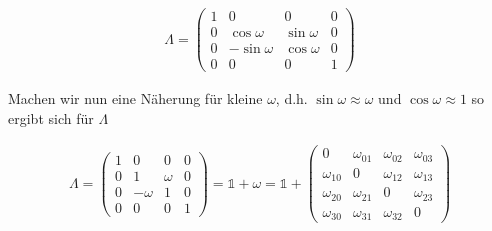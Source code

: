 \begin{align}
  \label{eq:35}
  \Lambda =  \begin{pmatrix}
1&0&0&0\\
0&\cos\omega&\sin\omega&0\\
0&-\sin\omega&\cos\omega&0\\
0&0&0&1
\end{pmatrix} 
\end{align}

Machen wir nun eine Näherung für kleine \(\omega\), d.h. \(\sin\omega\approx \omega\) und \(\cos\omega\approx1\) so ergibt sich für \(\Lambda\)

\begin{align}
  \label{eq:36}
   \Lambda =  \begin{pmatrix}
1&0&0&0\\
0&1&\omega&0\\
0&-\omega&1&0\\
0&0&0&1
\end{pmatrix} = \mathds 1 + \omega=\mathds 1+
  \begin{pmatrix}0&\omega_{01}&\omega_{02}&\omega_{03}\\ \omega_{10}&0&\omega_{12}&\omega_{13}\\\omega_{20}&\omega_{21}&0&\omega_{23}\\ \omega_{30}&\omega_{31}&\omega_{32}&0\end{pmatrix} 
\end{align}

